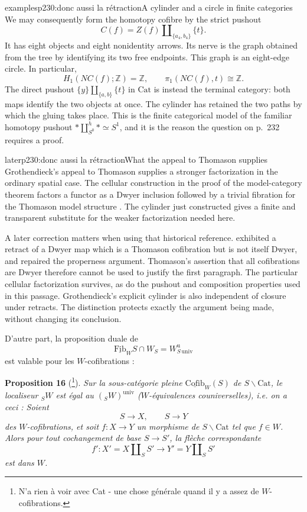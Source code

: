 \begin{dcomment}{examples}{p230:donc aussi la rétraction}{A cylinder and a circle in finite categories}
We may consequently form the homotopy cofibre by the strict pushout
\[
 C(f)=Z(f)\amalg_{\{a_4,b_4\}}\{t\}.
\]
It has eight objects and eight nonidentity arrows. Its nerve is the graph obtained from the tree by identifying its two free endpoints. This graph is an eight-edge circle. In particular,
\[
 H_1(NC(f);\mathbb Z)=\mathbb Z,
 \qquad \pi_1(NC(f),t)\cong\mathbb Z.
\]
The direct pushout $\{y\}\amalg_{\{a,b\}}\{t\}$ in $\mathrm{Cat}$ is instead the terminal category: both maps identify the two objects at once. The cylinder has retained the two paths by which the gluing takes place. This is the finite categorical model of the familiar homotopy pushout $*\amalg^h_{S^0}*\simeq S^1$, and it is the reason the question on p.~232 requires a proof.
\end{dcomment}


\begin{dcomment}{later}{p230:donc aussi la rétraction}{What the appeal to Thomason supplies}
Grothendieck's appeal to Thomason supplies a stronger factorization in the ordinary spatial case. The cellular construction in the proof of the model-category theorem factors a functor as a Dwyer inclusion followed by a trivial fibration for the Thomason model structure \citep[proof of CM5 and Theorem~4.9]{Thomason1980}. The cylinder just constructed gives a finite and transparent substitute for the weaker factorization needed here.

A later correction matters when using that historical reference. \citet{Cisinski1999Dwyer} exhibited a retract of a Dwyer map which is a Thomason cofibration but is not itself Dwyer, and repaired the properness argument. Thomason's assertion that all cofibrations are Dwyer therefore cannot be used to justify the first paragraph. The particular cellular factorization survives, as do the pushout and composition properties used in this passage. Grothendieck's explicit cylinder is also independent of closure under retracts. The distinction protects exactly the argument being made, without changing its conclusion.
\end{dcomment}


D'autre part, la proposition duale de
\[
\underline{\mathrm{Fib}}_W S \cap W_S = W^{\mathrm{u}}_{S\,\mathrm{univ}}
\]
est valable pour les $W$-cofibrations :

\textbf{Proposition 16} (\footnote[125]{N'a rien à voir avec Cat - une chose générale quand il y a assez de $W$-cofibrations.}). \textit{Sur la sous-catégorie pleine $\underline{\mathrm{Cofib}}_W(S)$ de $S\backslash\mathrm{Cat}$, le localiseur ${}_SW$ est égal au $({}_SW)^{\mathrm{univ}}$ ($W$-équivalences couniverselles), i.e. on a ceci : Soient}
\[
S \longrightarrow X, \qquad S \longrightarrow Y
\]
\textit{des $W$-cofibrations, et soit $f : X \longrightarrow Y$ un morphisme de $S\backslash\mathrm{Cat}$ tel que $f \in W$. Alors pour tout cochangement de base $S \longrightarrow S'$, la flèche correspondante}
\[
f' : X' = X \amalg_S S' \longrightarrow Y' = Y \amalg_S S'
\]
\textit{est dans $W$.}

